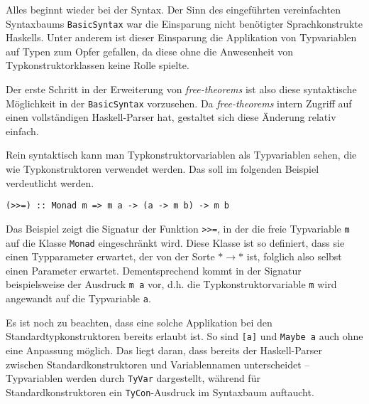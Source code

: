 Alles beginnt wieder bei der Syntax. Der Sinn des eingeführten vereinfachten Syntaxbaums \texttt{BasicSyntax} war
die Einsparung nicht benötigter Sprachkonstrukte Haskells. Unter anderem ist dieser Einsparung die Applikation
von Typvariablen auf Typen zum Opfer gefallen, da diese ohne die Anwesenheit von Typkonstruktorklassen keine Rolle
spielte.

Der erste Schritt in der Erweiterung von \textit{free-theorems} ist also diese syntaktische Möglichkeit in der \texttt{BasicSyntax}
vorzusehen. Da \textit{free-theorems} intern Zugriff auf einen vollständigen Haskell-Parser hat, gestaltet sich
diese Änderung relativ einfach.

Rein syntaktisch kann man Typkonstruktorvariablen als Typvariablen sehen, die wie Typkonstruktoren verwendet werden. Das
soll im folgenden Beispiel verdeutlicht werden.


\begin{verbatim}
(>>=) :: Monad m => m a -> (a -> m b) -> m b
\end{verbatim}

Das Beispiel zeigt die Signatur der Funktion \texttt{>>=}, in der die freie Typvariable \texttt{m} auf die Klasse \texttt{Monad}
eingeschränkt wird. Diese Klasse ist so definiert, dass sie einen Typparameter erwartet, der von der Sorte $* \rightarrow *$ ist,
folglich also selbst einen Parameter erwartet. Dementsprechend kommt in der Signatur beispielsweise der Ausdruck \texttt{m\ a} vor,
d.h. die Typkonstruktorvariable \texttt{m} wird angewandt auf die Typvariable \texttt{a}.

Es ist noch zu beachten, dass eine solche Applikation bei den Standardtypkonstruktoren bereits erlaubt ist.
So sind \texttt{[a]} und \texttt{Maybe a} auch ohne eine Anpassung möglich. Das liegt daran, dass bereits der
Haskell-Parser zwischen Standardkonstruktoren und Variablennamen unterscheidet -- Typvariablen werden durch \texttt{TyVar}
dargestellt, während für Standardkonstruktoren ein \texttt{TyCon}-Ausdruck im Syntaxbaum auftaucht.

